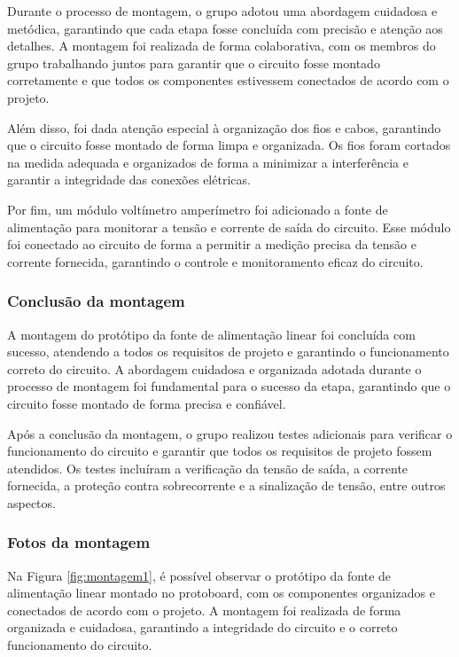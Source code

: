 Durante o processo de montagem, o grupo adotou uma abordagem cuidadosa e metódica, garantindo que cada etapa fosse concluída com precisão e atenção aos detalhes. A montagem foi realizada de forma colaborativa, com os membros do grupo trabalhando juntos para garantir que o circuito fosse montado corretamente e que todos os componentes estivessem conectados de acordo com o projeto.

Além disso, foi dada atenção especial à organização dos fios e cabos, garantindo que o circuito fosse montado de forma limpa e organizada. Os fios foram cortados na medida adequada e organizados de forma a minimizar a interferência e garantir a integridade das conexões elétricas.

Por fim, um módulo voltímetro amperímetro foi adicionado a fonte de alimentação para monitorar a tensão e corrente de saída do circuito. Esse módulo foi conectado ao circuito de forma a permitir a medição precisa da tensão e corrente fornecida, garantindo o controle e monitoramento eficaz do circuito.

\subsubsection*{Conclusão da montagem}

A montagem do protótipo da fonte de alimentação linear foi concluída com sucesso, atendendo a todos os requisitos de projeto e garantindo o funcionamento correto do circuito. A abordagem cuidadosa e organizada adotada durante o processo de montagem foi fundamental para o sucesso da etapa, garantindo que o circuito fosse montado de forma precisa e confiável.

Após a conclusão da montagem, o grupo realizou testes adicionais para verificar o funcionamento do circuito e garantir que todos os requisitos de projeto fossem atendidos. Os testes incluíram a verificação da tensão de saída, a corrente fornecida, a proteção contra sobrecorrente e a sinalização de tensão, entre outros aspectos.

\subsubsection*{Fotos da montagem}

Na Figura \ref{fig:montagem1}, é possível observar o protótipo da fonte de alimentação linear montado no protoboard, com os componentes organizados e conectados de acordo com o projeto. A montagem foi realizada de forma organizada e cuidadosa, garantindo a integridade do circuito e o correto funcionamento do circuito.

